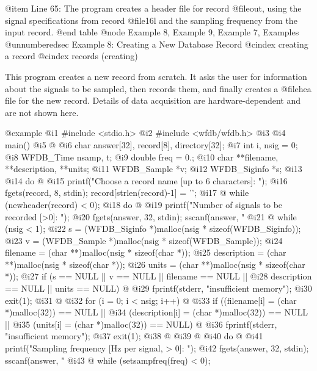 {{{{{{{{{{{{{{@item Line 65:
The program creates a header file for record @file{out}, using
the signal specifications from record @file{16l} and the sampling
frequency from the input record.
@end table
@node     Example 8, Example 9, Example 7, Examples
@unnumberedsec Example 8: Creating a New Database Record
@cindex creating a record
@cindex records (creating)

This program creates a new record from scratch.  It asks the user for
information about the signals to be sampled, then records them, and
finally creates a @file{hea} file for the new record.  Details of
data acquisition are hardware-dependent and are not shown here. 

@example
  @i{1}  #include <stdio.h>
  @i{2}  #include <wfdb/wfdb.h>
  @i{3}
  @i{4}  main()
  @i{5}  @{
  @i{6}      char answer[32], record[8], directory[32];
  @i{7}      int i, nsig = 0;
  @i{8}      WFDB_Time nsamp, t;
  @i{9}      double freq = 0.;
 @i{10}      char **filename, **description, **units;
 @i{11}      WFDB_Sample *v;
 @i{12}      WFDB_Siginfo *s;
 @i{13}
 @i{14}      do @{
 @i{15}          printf("Choose a record name [up to 6 characters]: ");
 @i{16}          fgets(record, 8, stdin); record[strlen(record)-1] = '\0';
 @i{17}      @} while (newheader(record) < 0);
 @i{18}      do @{
 @i{19}          printf("Number of signals to be recorded [>0]: ");
 @i{20}          fgets(answer, 32, stdin); sscanf(answer, "%
 @i{21}      @} while (nsig < 1);
 @i{22}      s = (WFDB_Siginfo *)malloc(nsig * sizeof(WFDB_Siginfo));
 @i{23}      v = (WFDB_Sample *)malloc(nsig * sizeof(WFDB_Sample));
 @i{24}      filename = (char **)malloc(nsig * sizeof(char *));
 @i{25}      description = (char **)malloc(nsig * sizeof(char *));
 @i{26}      units = (char **)malloc(nsig * sizeof(char *));
 @i{27}      if (s == NULL || v == NULL || filename == NULL ||
 @i{28}          description == NULL || units == NULL) @{
 @i{29}          fprintf(stderr, "insufficient memory\n");
 @i{30}          exit(1);
 @i{31}      @}
 @i{32}      for (i = 0; i < nsig; i++) @{
 @i{33}          if ((filename[i] = (char *)malloc(32)) == NULL ||
 @i{34}              (description[i] = (char *)malloc(32)) == NULL ||
 @i{35}              (units[i] = (char *)malloc(32)) == NULL) @{
 @i{36}              fprintf(stderr, "insufficient memory\n");
 @i{37}              exit(1);
 @i{38}          @}
 @i{39}      @}
 @i{40}      do @{
 @i{41}          printf("Sampling frequency [Hz per signal, > 0]: ");
 @i{42}          fgets(answer, 32, stdin); sscanf(answer, "%
 @i{43}      @} while (setsampfreq(freq) < 0);
}}}}}}}}}}}}}}}
